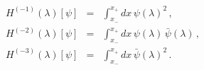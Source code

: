 \begin{equation}\label{eq:nonlocal constants}
 \begin{array}{rcl}
    H^{(-1)}(\lambda)[\psi] & = & \int_{x_-}^{x_+}dx\,\psi(\lambda)^2\,, \\
    H^{(-2)}(\lambda)[\psi] & =& \int_{x_-}^{x_+}dx\,\psi(\lambda)\,\bar{\psi}(\lambda)\,, \\
    H^{(-3)}(\lambda)[\psi] & =& \int_{x_-}^{x_+}dx\,\bar{\psi}(\lambda)^2\,. \
  \end{array}
\end{equation}

